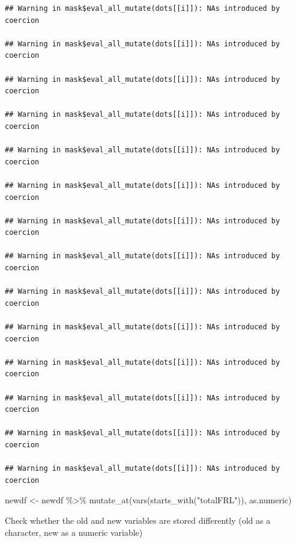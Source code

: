 \documentclass[
]{book}
\newenvironment{Shaded}{\begin{snugshade}}{\end{snugshade}}
\newcommand{\FunctionTok}[1]{\textcolor[rgb]{0.00,0.00,0.00}{#1}}
\newcommand{\NormalTok}[1]{#1}
\newcommand{\OtherTok}[1]{\textcolor[rgb]{0.56,0.35,0.01}{#1}}
\newcommand{\SpecialCharTok}[1]{\textcolor[rgb]{0.00,0.00,0.00}{#1}}
\newcommand{\StringTok}[1]{\textcolor[rgb]{0.31,0.60,0.02}{#1}}
\begin{document}
\begin{verbatim}
## Warning in mask$eval_all_mutate(dots[[i]]): NAs introduced by coercion

## Warning in mask$eval_all_mutate(dots[[i]]): NAs introduced by coercion

## Warning in mask$eval_all_mutate(dots[[i]]): NAs introduced by coercion

## Warning in mask$eval_all_mutate(dots[[i]]): NAs introduced by coercion

## Warning in mask$eval_all_mutate(dots[[i]]): NAs introduced by coercion

## Warning in mask$eval_all_mutate(dots[[i]]): NAs introduced by coercion

## Warning in mask$eval_all_mutate(dots[[i]]): NAs introduced by coercion

## Warning in mask$eval_all_mutate(dots[[i]]): NAs introduced by coercion

## Warning in mask$eval_all_mutate(dots[[i]]): NAs introduced by coercion

## Warning in mask$eval_all_mutate(dots[[i]]): NAs introduced by coercion

## Warning in mask$eval_all_mutate(dots[[i]]): NAs introduced by coercion

## Warning in mask$eval_all_mutate(dots[[i]]): NAs introduced by coercion

## Warning in mask$eval_all_mutate(dots[[i]]): NAs introduced by coercion

## Warning in mask$eval_all_mutate(dots[[i]]): NAs introduced by coercion
\end{verbatim}

\begin{Shaded}
\begin{Highlighting}[]
\NormalTok{newdf }\OtherTok{\textless{}{-}}\NormalTok{ newdf }\SpecialCharTok{\%\textgreater{}\%} 
  \FunctionTok{mutate\_at}\NormalTok{(}\FunctionTok{vars}\NormalTok{(}\FunctionTok{starts\_with}\NormalTok{(}\StringTok{"totalFRL"}\NormalTok{)), as.numeric)}
\end{Highlighting}
\end{Shaded}

Check whether the old and new variables are stored differently (old as a character, new as a numeric variable)

\begin{Shaded}
\end{Shaded}
\end{document}
